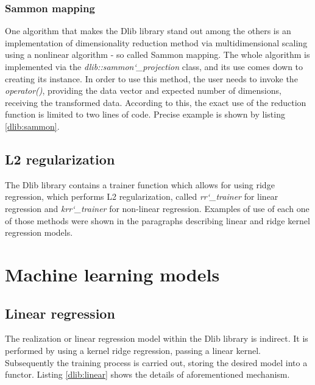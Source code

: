 
\subsubsection{Sammon mapping}

One algorithm that makes the Dlib library stand out among the others is an implementation of dimensionality reduction method via multidimensional scaling using a nonlinear algorithm - so called Sammon mapping\cite{sammon}. The whole algorithm is implemented via the \textit{dlib::sammon\char`_projection} class, and its use comes down to creating its instance. In order to use this method, the user needs to invoke the \textit{operator()}, providing the data vector and expected number of dimensions, receiving the transformed data. According to this, the exact use of the reduction function is limited to two lines of code. Precise example is shown by listing \ref{dlib:sammon}.


\subsection{L2 regularization}

The Dlib library contains a trainer function which allows for using ridge regression, which performs L2 regularization, called \textit{rr\char`_trainer} for linear regression and \textit{krr\char`_trainer} for non-linear regression. Examples of use of each one of those methods were shown in the paragraphs describing linear and ridge kernel regression models.

\section{Machine learning models}

\subsection{Linear regression}

The realization or linear regression model within the Dlib library is indirect. It is performed by using a kernel ridge regression, passing a linear kernel. Subsequently the training process is carried out, storing the desired model into a functor. Listing 
\ref{dlib:linear} shows the details of aforementioned mechanism.


